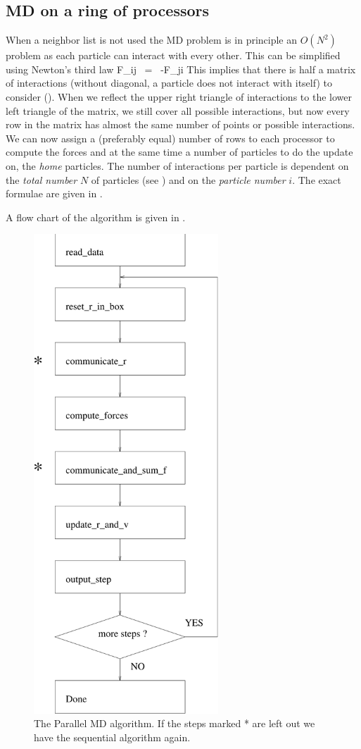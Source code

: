 {\subsection{MD on a ring of processors}
When a neighbor list is not used the MD problem is in principle an $O(N^2)$ 
problem as each particle can interact
with every other. This can be simplified using Newton's third law
\beq
F_{ij}  ~=~     -F_{ji}
\label{eqn:Newt3}
\eeq
This implies that there is half a matrix of interactions (without diagonal, 
a particle does not interact with itself) to consider ().
When we reflect the upper right triangle of interactions to the lower
left triangle of the matrix, we still cover all possible interactions,
but now every row in the matrix has almost the same number of points
or possible interactions.  We can now assign a (preferably equal)
number of rows to each processor to compute the forces and at the same
time a number of particles to do the update on, the {\em home}
particles. The number of interactions per particle is dependent on the
{\em total number} $N$ of particles (see ) and on the
{\em particle number} $i$.  The exact formulae are given in
.

A flow chart of the algorithm is given in .
\begin{figure}
\centerline{\includegraphics[height=18cm]{plots/mdpar}}
\caption[The Parallel MD algorithm.]{The Parallel MD algorithm. If
the steps marked * are left out we have the sequential algorithm
again.}
\label{fig:mdpar}
\end{figure}
\vfill

}
